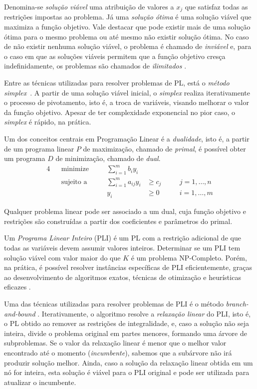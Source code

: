 \documentclass[12pt,a4paper]{article}
\begin{document}
Denomina-se \textit{solução viável} uma atribuição de valores a $x_j$ que satisfaz todas as restrições impostas ao problema. Já uma \textit{solução ótima} é uma solução viável que maximiza a função objetivo.
Vale destacar que pode existir mais de uma solução ótima para o mesmo problema ou até mesmo não existir solução ótima. No caso de não existir
nenhuma solução viável, o problema é chamado de \textit{inviável} e, para o caso em que as soluções viáveis permitem que a função objetivo cresça indefinidamente, os problemas são chamados de \textit{ilimitados} \cite{Chvatal1983}.

Entre as técnicas utilizadas para resolver problemas de PL, está o \textit{método simplex}~\cite{Chvatal1983}.
A partir de uma solução viável inicial, o \textit{simplex} realiza iterativamente o processo de pivotamento,
isto é, a troca de variáveis, visando melhorar o valor da função objetivo. Apesar de ter complexidade exponencial no pior caso,
o \textit{simplex} é rápido, na prática.

Um dos conceitos centrais em Programação Linear é a \textit{dualidade}, isto é, a partir de um programa linear
$P$ de maximização, chamado de \textit{primal}, é possível obter um programa $D$ de minimização, chamado
de \textit{dual}. 
\begin{alignat}{4}
&&\text{minimize}   \quad && \sum_{i = 1}^{m} b_i y_i \label{equa:obj2}\\
&&\text{sujeito a} \quad && \sum_{i = 1}^{m} a_{ij} y_i & \geq c_j     \quad && j = 1, \ldots, n \label{res:3.1} \\
&&                        && y_i                       & \ge 0        \quad &&  i = 1, \ldots, m \label{res:4.1}
\end{alignat}

Qualquer problema linear pode ser associado a um dual,
cuja função objetivo e restrições são construídas a partir dos coeficientes e parâmetros do primal.

Um \emph{Programa Linear Inteiro} (PLI) é um PL com a restrição adicional de que todas as variáveis devem assumir valores inteiros.
Determinar se um PLI tem solução viável com valor maior do que $K$ é um problema NP-Completo. Porém, na prática, é possível resolver instâncias específicas de PLI eficientemente,
graças ao desenvolvimento de algoritmos exatos, técnicas de otimização e heurísticas eficazes \cite{Wolsey2021}.

Uma das técnicas utilizadas para resolver problemas de PLI é o método \emph{branch-and-bound} \cite{Wolsey2021}.
Iterativamente, o algoritmo resolve a \emph{relaxação linear} do PLI, isto é, o PL obtido ao remover as restrições de integralidade,
e, caso a solução não seja inteira, divide o problema original em partes menores, formando uma árvore de subproblemas.
Se o valor da relaxação linear é menor que o melhor valor encontrado até o momento (\emph{incumbente}), sabemos que a subárvore
não irá produzir solução melhor. Ainda, caso a solução da relaxação linear obtida em um nó for inteira, esta solução é viável para o PLI original
e pode ser utilizada para atualizar o incumbente.
\end{document}
